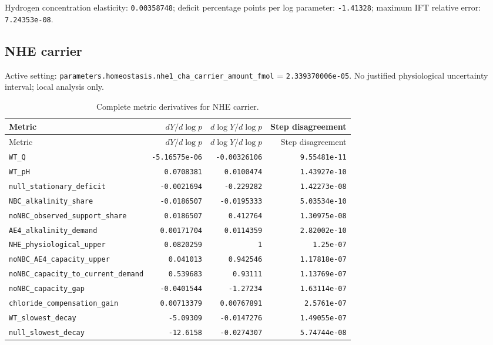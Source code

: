 Hydrogen concentration elasticity: \texttt{0.00358748}; deficit percentage points per log parameter: \texttt{-1.41328}; maximum IFT relative error: \texttt{7.24353e-08}.\par

\subsection*{NHE carrier}
Active setting: \nolinkurl{parameters.homeostasis.nhe1_cha_carrier_amount_fmol} = \texttt{2.339370006e-05}. No justified physiological uncertainty interval; local analysis only.


\begingroup\scriptsize
\setlength{\tabcolsep}{3pt}
\begin{longtable}{p{.44\linewidth}rrr}
\caption{Complete metric derivatives for NHE carrier.}\\
\toprule
Metric & $dY/d\log p$ & $d\log Y/d\log p$ & Step disagreement \\
\midrule\endfirsthead
\toprule
Metric & $dY/d\log p$ & $d\log Y/d\log p$ & Step disagreement \\
\midrule\endhead
\bottomrule\endfoot
\nolinkurl{WT_Q} & \texttt{-5.16575e-06} & \texttt{-0.00326106} & \texttt{9.55481e-11} \\
\nolinkurl{WT_pH} & \texttt{0.0708381} & \texttt{0.0100474} & \texttt{1.43927e-10} \\
\nolinkurl{null_stationary_deficit} & \texttt{-0.0021694} & \texttt{-0.229282} & \texttt{1.42273e-08} \\
\nolinkurl{NBC_alkalinity_share} & \texttt{-0.0186507} & \texttt{-0.0195333} & \texttt{5.03534e-10} \\
\nolinkurl{noNBC_observed_support_share} & \texttt{0.0186507} & \texttt{0.412764} & \texttt{1.30975e-08} \\
\nolinkurl{AE4_alkalinity_demand} & \texttt{0.00171704} & \texttt{0.0114359} & \texttt{2.82002e-10} \\
\nolinkurl{NHE_physiological_upper} & \texttt{0.0820259} & \texttt{1} & \texttt{1.25e-07} \\
\nolinkurl{noNBC_AE4_capacity_upper} & \texttt{0.041013} & \texttt{0.942546} & \texttt{1.17818e-07} \\
\nolinkurl{noNBC_capacity_to_current_demand} & \texttt{0.539683} & \texttt{0.93111} & \texttt{1.13769e-07} \\
\nolinkurl{noNBC_capacity_gap} & \texttt{-0.0401544} & \texttt{-1.27234} & \texttt{1.63114e-07} \\
\nolinkurl{chloride_compensation_gain} & \texttt{0.00713379} & \texttt{0.00767891} & \texttt{2.5761e-07} \\
\nolinkurl{WT_slowest_decay} & \texttt{-5.09309} & \texttt{-0.0147276} & \texttt{1.49055e-07} \\
\nolinkurl{null_slowest_decay} & \texttt{-12.6158} & \texttt{-0.0274307} & \texttt{5.74744e-08} \\
\end{longtable}
\endgroup

